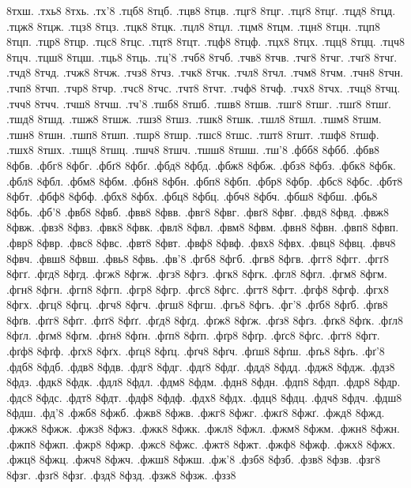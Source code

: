 {8тхш.
.тхь8
8тхь.
.тх'8
.тцб8
8тцб.
.тцв8
8тцв.
.тцг8
8тцг.
.тцґ8
8тцґ.
.тцд8
8тцд.
.тцж8
8тцж.
.тцз8
8тцз.
.тцк8
8тцк.
.тцл8
8тцл.
.тцм8
8тцм.
.тцн8
8тцн.
.тцп8
8тцп.
.тцр8
8тцр.
.тцс8
8тцс.
.тцт8
8тцт.
.тцф8
8тцф.
.тцх8
8тцх.
.тцц8
8тцц.
.тцч8
8тцч.
.тцш8
8тцш.
.тць8
8тць.
.тц'8
.тчб8
8тчб.
.тчв8
8тчв.
.тчг8
8тчг.
.тчґ8
8тчґ.
.тчд8
8тчд.
.тчж8
8тчж.
.тчз8
8тчз.
.тчк8
8тчк.
.тчл8
8тчл.
.тчм8
8тчм.
.тчн8
8тчн.
.тчп8
8тчп.
.тчр8
8тчр.
.тчс8
8тчс.
.тчт8
8тчт.
.тчф8
8тчф.
.тчх8
8тчх.
.тчц8
8тчц.
.тчч8
8тчч.
.тчш8
8тчш.
.тч'8
.тшб8
8тшб.
.тшв8
8тшв.
.тшг8
8тшг.
.тшґ8
8тшґ.
.тшд8
8тшд.
.тшж8
8тшж.
.тшз8
8тшз.
.тшк8
8тшк.
.тшл8
8тшл.
.тшм8
8тшм.
.тшн8
8тшн.
.тшп8
8тшп.
.тшр8
8тшр.
.тшс8
8тшс.
.тшт8
8тшт.
.тшф8
8тшф.
.тшх8
8тшх.
.тшц8
8тшц.
.тшч8
8тшч.
.тшш8
8тшш.
.тш'8
.фбб8
8фбб.
.фбв8
8фбв.
.фбг8
8фбг.
.фбґ8
8фбґ.
.фбд8
8фбд.
.фбж8
8фбж.
.фбз8
8фбз.
.фбк8
8фбк.
.фбл8
8фбл.
.фбм8
8фбм.
.фбн8
8фбн.
.фбп8
8фбп.
.фбр8
8фбр.
.фбс8
8фбс.
.фбт8
8фбт.
.фбф8
8фбф.
.фбх8
8фбх.
.фбц8
8фбц.
.фбч8
8фбч.
.фбш8
8фбш.
.фбь8
8фбь.
.фб'8
.фвб8
8фвб.
.фвв8
8фвв.
.фвг8
8фвг.
.фвґ8
8фвґ.
.фвд8
8фвд.
.фвж8
8фвж.
.фвз8
8фвз.
.фвк8
8фвк.
.фвл8
8фвл.
.фвм8
8фвм.
.фвн8
8фвн.
.фвп8
8фвп.
.фвр8
8фвр.
.фвс8
8фвс.
.фвт8
8фвт.
.фвф8
8фвф.
.фвх8
8фвх.
.фвц8
8фвц.
.фвч8
8фвч.
.фвш8
8фвш.
.фвь8
8фвь.
.фв'8
.фгб8
8фгб.
.фгв8
8фгв.
.фгг8
8фгг.
.фгґ8
8фгґ.
.фгд8
8фгд.
.фгж8
8фгж.
.фгз8
8фгз.
.фгк8
8фгк.
.фгл8
8фгл.
.фгм8
8фгм.
.фгн8
8фгн.
.фгп8
8фгп.
.фгр8
8фгр.
.фгс8
8фгс.
.фгт8
8фгт.
.фгф8
8фгф.
.фгх8
8фгх.
.фгц8
8фгц.
.фгч8
8фгч.
.фгш8
8фгш.
.фгь8
8фгь.
.фг'8
.фґб8
8фґб.
.фґв8
8фґв.
.фґг8
8фґг.
.фґґ8
8фґґ.
.фґд8
8фґд.
.фґж8
8фґж.
.фґз8
8фґз.
.фґк8
8фґк.
.фґл8
8фґл.
.фґм8
8фґм.
.фґн8
8фґн.
.фґп8
8фґп.
.фґр8
8фґр.
.фґс8
8фґс.
.фґт8
8фґт.
.фґф8
8фґф.
.фґх8
8фґх.
.фґц8
8фґц.
.фґч8
8фґч.
.фґш8
8фґш.
.фґь8
8фґь.
.фґ'8
.фдб8
8фдб.
.фдв8
8фдв.
.фдг8
8фдг.
.фдґ8
8фдґ.
.фдд8
8фдд.
.фдж8
8фдж.
.фдз8
8фдз.
.фдк8
8фдк.
.фдл8
8фдл.
.фдм8
8фдм.
.фдн8
8фдн.
.фдп8
8фдп.
.фдр8
8фдр.
.фдс8
8фдс.
.фдт8
8фдт.
.фдф8
8фдф.
.фдх8
8фдх.
.фдц8
8фдц.
.фдч8
8фдч.
.фдш8
8фдш.
.фд'8
.фжб8
8фжб.
.фжв8
8фжв.
.фжг8
8фжг.
.фжґ8
8фжґ.
.фжд8
8фжд.
.фжж8
8фжж.
.фжз8
8фжз.
.фжк8
8фжк.
.фжл8
8фжл.
.фжм8
8фжм.
.фжн8
8фжн.
.фжп8
8фжп.
.фжр8
8фжр.
.фжс8
8фжс.
.фжт8
8фжт.
.фжф8
8фжф.
.фжх8
8фжх.
.фжц8
8фжц.
.фжч8
8фжч.
.фжш8
8фжш.
.фж'8
.фзб8
8фзб.
.фзв8
8фзв.
.фзг8
8фзг.
.фзґ8
8фзґ.
.фзд8
8фзд.
.фзж8
8фзж.
.фзз8
}
